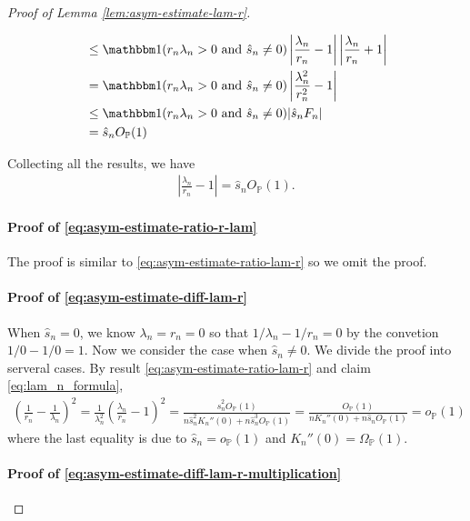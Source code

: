 \documentclass[12pt]{article}
\theoremstyle{definition}
\def\P{\mathbb{P}}
\def\P{\mathbb{P}}
\renewcommand{\P}{\mathbb{P}}							%
\newcommand{\indicator}{\mathbbm 1}						%
\begin{document}
\begin{proof}[Proof of Lemma \ref{lem:asym-estimate-lam-r}]
\begin{itemize}
\begin{align*}
			&
			\leq \indicator(r_n\lambda_n>0 \text{ and }\hat s_n\neq 0)\left|\frac{\lambda_n}{r_n}-1\right|\left|\frac{\lambda_n}{r_n}+1\right|\\
			&
			=\indicator(r_n\lambda_n>0 \text{ and }\hat s_n\neq 0)\left|\frac{\lambda_n^2}{r_n^2}-1\right|\\
			&
			\leq \indicator(r_n\lambda_n>0 \text{ and }\hat s_n\neq 0)|\hat s_n F_n|\\
			&
			=\hat s_n O_{\P}(1)
		\end{align*}
	\end{itemize}
	Collecting all the results, we have 
	\begin{align*}
		\left|\frac{\lambda_n}{r_n}-1\right|=\hat s_nO_{\P}(1).
	\end{align*}

	\paragraph{Proof of \eqref{eq:asym-estimate-ratio-r-lam}}

	The proof is similar to \eqref{eq:asym-estimate-ratio-lam-r} so we omit the proof.

	\paragraph{Proof of \eqref{eq:asym-estimate-diff-lam-r}}


	When $\hat s_n=0$, we know $\lambda_n=r_n=0$ so that $1/\lambda_n-1/r_n=0$ by the convetion $1/0-1/0=1$. Now we consider the case when $\hat s_n\neq 0$. We divide the proof into serveral cases. By result \eqref{eq:asym-estimate-ratio-lam-r} and claim \eqref{eq:lam_n_formula},
	\begin{align*}
		\left(\frac{1}{r_n}-\frac{1}{\lambda_n}\right)^2=\frac{1}{\lambda_n^2}\left(\frac{\lambda_n}{r_n}-1\right)^2=\frac{\hat s_n^2  O_{\P}(1)}{n\hat s_n^2 K_n''(0)+n\hat s_n^3O_{\P}(1)}=\frac{O_{\P}(1)}{nK_n''(0)+n\hat s_nO_{\P}(1)}=o_{\P}(1)
	\end{align*}
	where the last equality is due to $\hat s_n=o_{\P}(1)$ and $K_n''(0)=\Omega_{\P}(1)$. 

	\paragraph{Proof of \eqref{eq:asym-estimate-diff-lam-r-multiplication}}


\end{proof}
\end{document}
